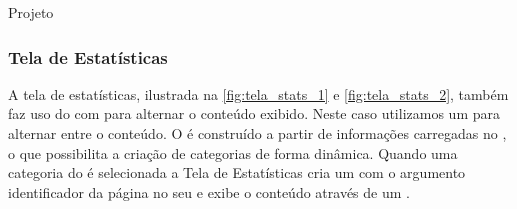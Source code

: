 \documentclass[
	12pt,				%
	openany,			%
	twoside,			%
	a4paper,			%
	english,			%
	french,				%
	spanish,			%
	brazil				%
	]{abntex2}
\begin{document}
\begin{chapter}{Projeto}
\newpage
\subsubsection{Tela de Estatísticas}
\label{ActivityStatistics}
A tela de estatísticas, ilustrada na \autoref{fig:tela_stats_1} e \autoref{fig:tela_stats_2}, também faz uso do  com  para alternar o conteúdo exibido. Neste caso utilizamos um  para alternar entre o conteúdo. O  é construído a partir de informações carregadas no , o que possibilita a criação de categorias de forma dinâmica. Quando uma categoria do  é selecionada a Tela de Estatísticas cria um  com o argumento identificador da página no seu  e exibe o conteúdo através de um .
  

\end{chapter}
\end{document}
